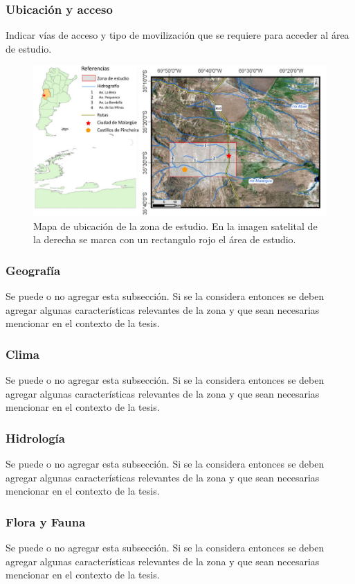             \subsubsection{Ubicación y acceso}
            Indicar vías de acceso y tipo de movilización que se requiere para acceder al área de estudio.
            \begin{figure} [h] %
                \centering
                \includegraphics[width=0.7\linewidth]{Fig. ubicacion.jpg}
                \caption{\small Mapa de ubicación de la zona de estudio. En la imagen satelital de la derecha se marca con un rectangulo rojo el área de estudio.}
                \label{fig:enter-label}
            \end{figure}
            \subsubsection{Geografía}
             Se puede o no agregar esta subsección. Si se la considera entonces se deben agregar algunas características relevantes de la zona y que sean necesarias mencionar en el contexto de la tesis. 
            \subsubsection{Clima}
             Se puede o no agregar esta subsección. Si se la considera entonces se deben agregar algunas características relevantes de la zona y que sean necesarias mencionar en el contexto de la tesis. 
            \subsubsection{Hidrología}
            Se puede o no agregar esta subsección. Si se la considera entonces se deben agregar algunas características relevantes de la zona y que sean necesarias mencionar en el contexto de la tesis. 
            \subsubsection{Flora y Fauna}
            Se puede o no agregar esta subsección. Si se la considera entonces se deben agregar algunas características relevantes de la zona y que sean necesarias mencionar en el contexto de la tesis. 
